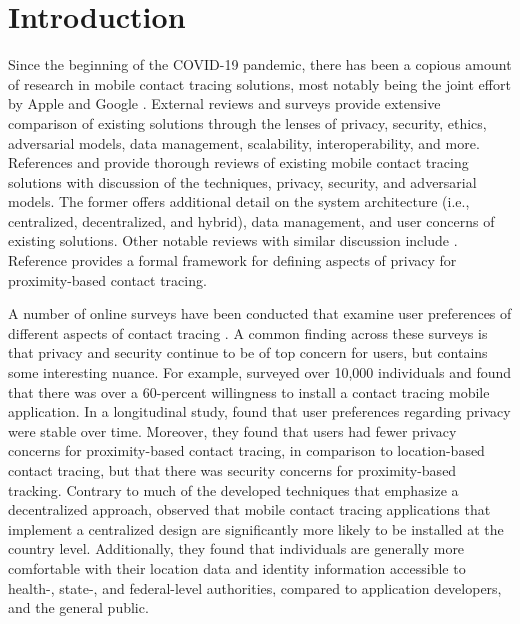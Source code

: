 \chapter{Introduction}


Since the beginning of the COVID-19 pandemic, there has been a copious amount of research in mobile contact tracing solutions, most notably being the joint effort by Apple and Google \cite{AppleGoogle}. External reviews and surveys provide extensive comparison of existing solutions through the lenses of privacy, security, ethics, adversarial models, data management, scalability, interoperability, and more. References \cite{Ahmed2020} and \cite{Martin2020} provide thorough reviews of existing mobile contact tracing solutions with discussion of the techniques, privacy, security, and adversarial models. The former offers additional detail on the system architecture (i.e., centralized, decentralized, and hybrid), data management, and user concerns of existing solutions. Other notable reviews with similar discussion include \cite{Wen2020, Raskar2020, Cho2020, Dar2020, Lucivero2020}. Reference \cite{Kuhn2021} provides a formal framework for defining aspects of privacy for proximity-based contact tracing.

A number of online surveys have been conducted that examine user preferences of different aspects of contact tracing \cite{Simko2020, Altmann2020, Li2020}. A common finding across these surveys is that privacy and security continue to be of top concern for users, but contains some interesting nuance. For example, \cite{Altmann2020} surveyed over 10,000 individuals and found that there was over a 60-percent willingness to install a contact tracing mobile application. In a longitudinal study, \cite{Simko2020} found that user preferences regarding privacy were stable over time. Moreover, they found that users had fewer privacy concerns for proximity-based contact tracing, in comparison to location-based contact tracing, but that there was security concerns for proximity-based tracking. Contrary to much of the developed techniques that emphasize a decentralized approach, \cite{Li2020} observed that mobile contact tracing applications that implement a centralized design are significantly more likely to be installed at the country level. Additionally, they found that individuals are generally more comfortable with their location data and identity information accessible to health-, state-, and federal-level authorities, compared to application developers, and the general public.

